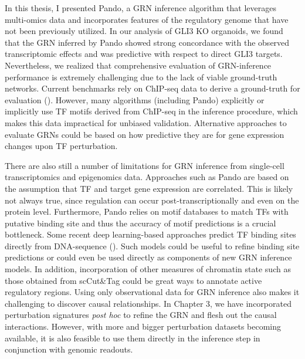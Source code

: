 In this thesis, I presented Pando, a GRN inference algorithm that leverages multi-omics data and incorporates features of the regulatory genome that have not been previously utilized. In our analysis of GLI3 KO organoids, we found that the GRN inferred by Pando showed strong concordance with the observed transcriptomic effects and was predictive with respect to direct GLI3 targets. Nevertheless, we realized that comprehensive evaluation of GRN-inference performance is extremely challenging due to the lack of viable ground-truth networks. Current benchmarks rely on ChIP-seq data to derive a ground-truth for evaluation (\cite{pratapa_benchmarking_2020}). However, many algorithms (including Pando) explicitly or implicitly use TF motifs derived from ChIP-seq in the inference procedure, which makes this data impractical for unbiased validation. Alternative approaches to evaluate GRNs could be based on how predictive they are for gene expression changes upon TF perturbation. 

There are also still a number of limitations for GRN inference from single-cell transcriptomics and epigenomics data. Approaches such as Pando are based on the assumption that TF and target gene expression are correlated. This is likely not always true, since regulation can occur post-transcriptionally and even on the protein level. Furthermore, Pando relies on motif databases to match TFs with putative binding site and thus the accuracy of motif predictions is a crucial bottleneck. Some recent deep learning-based approaches predict TF binding sites directly from DNA-sequence (\cite{avsec_effective_2021,janssens_decoding_2022}). Such models could be useful to refine binding site predictions or could even be used directly as components of new GRN inference models. In addition, incorporation of other measures of chromatin state such as those obtained from scCut\&Tag could be great ways to annotate active regulatory regions. Using only observational data for GRN inference also makes it challenging to discover causal relationships. In Chapter 3, we have incorporated perturbation signatures \textit{post hoc} to refine the GRN and flesh out the causal interactions. However, with more and bigger perturbation datasets becoming available, it is also feasible to use them directly in the inference step in conjunction with genomic readouts. 

